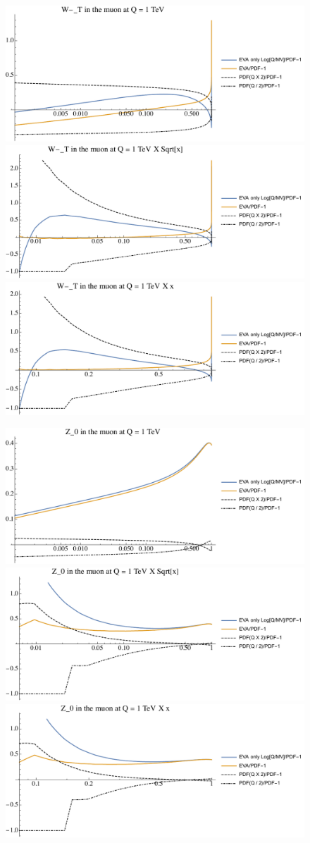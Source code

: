\documentclass[a4paper,11pt]{article}
\begin{document}
\begin{figure}[ht]
\includegraphics[width=0.4\linewidth]{PlotPDFs/ratios/1TeV/W-_T_Q.pdf}
\includegraphics[width=0.4\linewidth]{PlotPDFs/ratios/1TeV/W-_T_Qsqrtx.pdf}
\includegraphics[width=0.4\linewidth]{PlotPDFs/ratios/1TeV/W-_T_Qx.pdf}
\end{figure}

\begin{figure}[ht]
\includegraphics[width=0.4\linewidth]{PlotPDFs/ratios/1TeV/Z_0_Q.pdf}
\includegraphics[width=0.4\linewidth]{PlotPDFs/ratios/1TeV/Z_0_Qsqrtx.pdf}
\includegraphics[width=0.4\linewidth]{PlotPDFs/ratios/1TeV/Z_0_Qx.pdf}
\end{figure}
\end{document}
